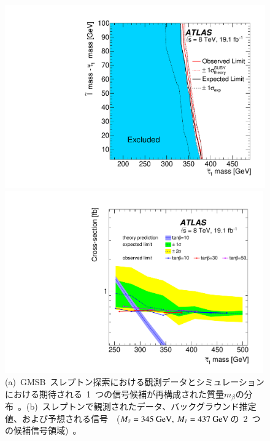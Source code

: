 \begin{figure}[H]
\begin{minipage}{0.49\hsize}
    \subcaption{}
    \end{minipage}\\
    \begin{minipage}{0.49\hsize}
    \centering   
    \includegraphics[width=\textwidth]{img/stau/fig_06a.pdf}
    \subcaption{}
    \end{minipage}
    \begin{minipage}{0.49\hsize}
    \centering   
    \includegraphics[width=0.99\textwidth]{img/stau/fig_07a.pdf}
    \end{minipage}
    \caption[(a)~GMSB~スレプトン探索における観測データとシミュレーションにおける期待される~1~つの信号候補が再構成された質量$m_{\beta}$の分布。(b)~スレプトンで観測されたデータ、バックグラウンド推定値、および予想される信号。(c)~$95\%$信頼水準における直接生成されたスレプトンの除外領域。(d)~スタウ粒子を直接生成するための質量と$\rm{tan}\beta$の~3~つの値の関数としての断面積の上限。]{(a)~GMSB~スレプトン探索における観測データとシミュレーションにおける期待される~1~つの信号候補が再構成された質量$m_{\beta}$の分布~\cite{AR:03}。(b)~スレプトンで観測されたデータ、バックグラウンド推定値、および予想される信号~\cite{AR:03}~($\it{M}_{\tilde{\tau}}=\rm{345}~\rm{GeV},~\it{M}_{\tilde{\tau}}=\rm{437}~\rm{GeV}$の~2~つの候補信号領域)~。
}
\end{figure}
